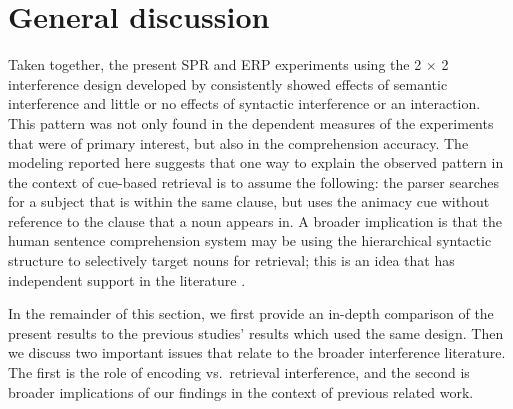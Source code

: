\documentclass[review,preprint,12pt,authoryear,floatsintext]{elsarticle}
\begin{document}
{{}%

\section{General discussion}

{Taken together, the present SPR and ERP experiments using the 2 $\times$ 2 interference design developed by \cite{vandyke07} consistently showed effects of semantic interference and little or no effects of syntactic interference or an interaction.}\label{only_this_design} This pattern was not only found in the dependent measures of the experiments that were of primary interest, but also in the comprehension accuracy. 
The modeling reported here suggests that one way to explain the observed pattern in the context of cue-based retrieval is to assume the following: the parser searches for a subject that is within the same clause, but uses the animacy cue without reference to the clause that a noun appears in. A broader implication is that the human sentence comprehension system may be using the hierarchical syntactic structure to selectively target nouns for retrieval; this is an idea that has independent support in the literature \citep[e.g.,][]{Sturt2003,dillon2013,yadav2021individual}.

In the remainder of this section, we first provide an in-depth comparison of the present results to the previous studies' results which used the same design. Then we discuss two important issues that relate to the broader interference literature. The first is the role of encoding vs.\ retrieval interference, and the second is broader implications of our findings in the context of previous related work.

}
\end{document}
